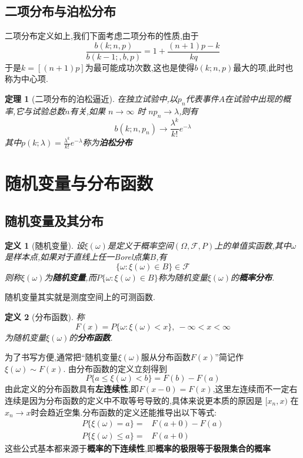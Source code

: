 \documentclass[12pt,a4paper]{article}
\newtheorem{thm}{定理}[subsection]  %
\newtheorem{definition}{定义}[subsection] %
\begin{document}
\subsection{二项分布与泊松分布}
二项分布定义如上,我们下面考虑二项分布的性质,由于\[\frac{b(k;n,p)}{b(k-1;,b,p)}=1 + \frac{(n+1)p-k}{kq}\]
于是$k=\left[(n+1)p\right]$为最可能成功次数,这也是使得$b(k;n,p)$最大的项,此时也称为中心项.
\begin{thm}[二项分布的泊松逼近]
    在独立试验中,以$p_n$代表事件$A$在试验中出现的概率,它与试验总数$n$有关,如果 $n\rightarrow \infty$ 时 $np_n\rightarrow \lambda$,则有
    \[b(k;n,p_n)\rightarrow \frac{\lambda^k}{k!}e^{-\lambda}\]
    其中$p(k;\lambda)=\frac{\lambda^k}{k!}e^{-\lambda}$称为\textbf{泊松分布}
\end{thm}
\newpage
\section{随机变量与分布函数}
\subsection{随机变量及其分布}
\begin{definition}[随机变量]
    设$\xi(\omega)$是定义于概率空间$(\varOmega,\mathscr{F},P)$上的单值实函数,其中$\omega$是样本点,如果对于直线上任一Borel点集$B$,有
    \[\{\omega:\xi(\omega)\in B\}\in \mathscr{F}\]
    则称$\xi(\omega)$为\textbf{随机变量},而$P\{\omega:\xi(\omega)\in B\}$称为随机变量$\xi(\omega)$的\textbf{概率分布}.
\end{definition}
随机变量其实就是测度空间上的可测函数.
\begin{definition}[分布函数]
    称\[F(x)=P\{\omega:\xi(\omega)<x\},\ -\infty<x<\infty\]
    为随机变量$\xi(\omega)$的\textbf{分布函数}.
\end{definition}
为了书写方便,通常把“随机变量$\xi(\omega)$服从分布函数$F(x)$”简记作$\xi(\omega)\sim F(x)$.
由分布函数的定义立刻得到\[P\{a\leq \xi (\omega)<b \} = F(b)-F(a)\]
由此定义的分布函数具有\textbf{左连续性},即$F(x-0)=F(x)$,这里左连续而不一定右连续是因为分布函数的定义中不取等号导致的,具体来说更本质的原因是
 $[x_n,x )$ 在$x_n\rightarrow x$时会趋近空集.分布函数的定义还能推导出以下等式:
\[\begin{aligned}
    P\{\xi(\omega)=a\}=&F(a+0)-F(a) \\ P\{\xi(\omega)\leq a\} =& F(a+0)
\end{aligned}\]
这些公式基本都来源于\textbf{概率的下连续性},即\textbf{概率的极限等于极限集合的概率}
\end{document}

